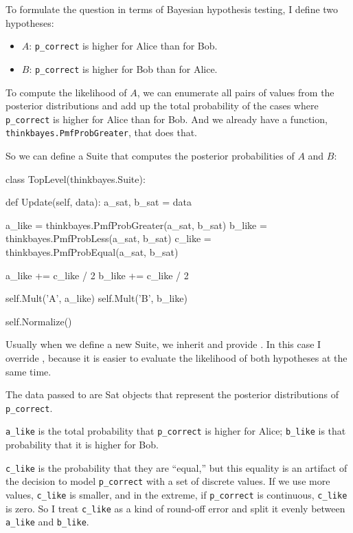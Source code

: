 \documentclass[12pt]{book}
\theoremstyle{exercise}
\begin{document}
To formulate the question in terms of Bayesian hypothesis testing,
I define two hypotheses:

\begin{itemize}

\item $A$: \verb"p_correct" is higher for Alice than for Bob.

\item $B$: \verb"p_correct" is higher for Bob than for Alice.

\end{itemize}

To compute the likelihood of $A$, we can enumerate all pairs of values
from the posterior distributions and add up the total probability of
the cases where \verb"p_correct" is higher for Alice than for Bob.
And we already have a function, \verb"thinkbayes.PmfProbGreater",
that does that.

So we can define a Suite that computes the posterior probabilities
of $A$ and $B$:

\begin{code}
class TopLevel(thinkbayes.Suite):

    def Update(self, data):
        a_sat, b_sat = data

        a_like = thinkbayes.PmfProbGreater(a_sat, b_sat)
        b_like = thinkbayes.PmfProbLess(a_sat, b_sat)
        c_like = thinkbayes.PmfProbEqual(a_sat, b_sat)

        a_like += c_like / 2
        b_like += c_like / 2

        self.Mult('A', a_like)
        self.Mult('B', b_like)

        self.Normalize()
\end{code}

Usually when we define a new Suite, we inherit 
and provide .  In this case I override ,
because it is easier to evaluate the likelihood of both
hypotheses at the same time.

The data passed to  are Sat objects that represent
the posterior distributions of \verb"p_correct".

\verb"a_like" is the total probability that
\verb"p_correct" is higher for Alice; \verb"b_like" is that
probability that it is higher for Bob.

\verb"c_like" is the probability that they are ``equal,'' but this
equality is an artifact of the decision to model \verb"p_correct" with
a set of discrete values.  If we use more values, \verb"c_like"
is smaller, and in the extreme, if \verb"p_correct" is
continuous, \verb"c_like" is zero.  So I treat \verb"c_like" as
a kind of round-off error and split it evenly between \verb"a_like"
and \verb"b_like".
\end{document}
